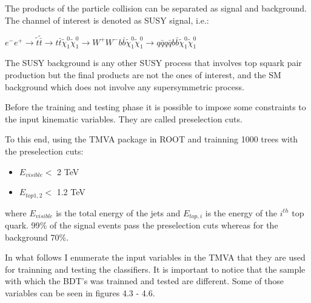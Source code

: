 \documentclass[12pt,a4paper]{report}
\begin{document}
The products of the particle collision can be separated as signal and background.
The channel of interest is denoted as SUSY signal, i.e.:

 $e^{-}e^{+} \rightarrow \tilde{t}\tilde{\bar{t}} \rightarrow t \bar{t}\tilde{\chi}_{1}^{0}
 \tilde{\chi}^{0}_{1} \rightarrow
 W^{+}W^{-} b \bar{b} \tilde{\chi}_{1}^{0}  \tilde{\chi}_{1}^{0} \rightarrow 
 q \bar{q} q \bar{q} b \bar{b} \tilde{\chi}_{1}^{0}  \tilde{\chi}_{1}^{0}$
 
The SUSY background is any other SUSY process that involves top squark pair production but the final products 
are not the ones of interest, and the SM background which does not involve any supersymmetric process. 

Before the training and testing phase it is possible to impose some constraints to the input kinematic 
variables. They are called preselection cuts.



To this end, using the TMVA package in ROOT and trainning 1000 trees with the  preselection cuts:

\begin{itemize}
 \item $E_{visible} <$ 2 TeV
 \item $E_{top 1,2} <$ 1.2 TeV
\end{itemize}

where $E_{visible}$ is the total energy of the jets and $E_{top,i}$ is the energy of the $i^{th}$ top quark.
99$\%$ of the signal events pass the preselection cuts whereas for the background 70$\%$.

In what follows I enumerate the input variables in the TMVA that they are used for trainning and testing 
the classifiers. It is important to notice that the sample with which the BDT's was trainned and tested are
different. Some of those variables can be seen in figures 4.3 - 4.6.
\end{document}
